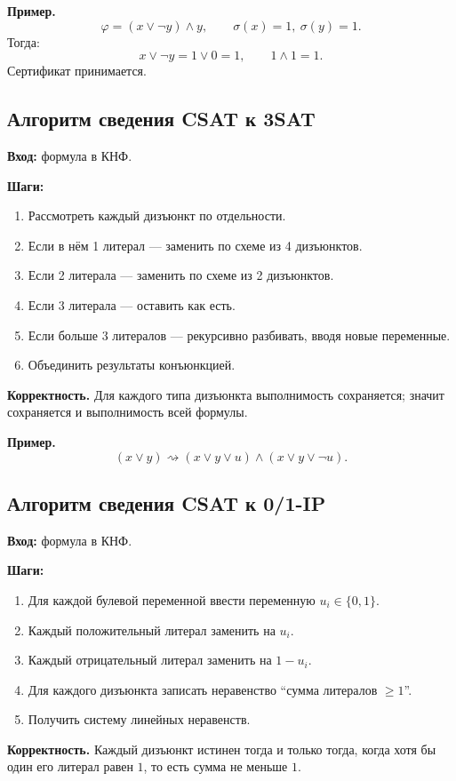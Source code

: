 \documentclass[12pt,a4paper]{article}
\theoremstyle{definition}
\theoremstyle{plain}
\begin{document}
\textbf{Пример.}
\[
\varphi=(x\vee \neg y)\wedge y,\qquad \sigma(x)=1,\ \sigma(y)=1.
\]
Тогда:
\[
x\vee\neg y=1\vee 0=1,\qquad 1\wedge 1=1.
\]
Сертификат принимается.

\subsection{Алгоритм сведения \textsc{CSAT} к \textsc{3SAT}}
\textbf{Вход:} формула в КНФ.

\textbf{Шаги:}
\begin{enumerate}
\item Рассмотреть каждый дизъюнкт по отдельности.
\item Если в нём 1 литерал --- заменить по схеме из 4 дизъюнктов.
\item Если 2 литерала --- заменить по схеме из 2 дизъюнктов.
\item Если 3 литерала --- оставить как есть.
\item Если больше 3 литералов --- рекурсивно разбивать, вводя новые переменные.
\item Объединить результаты конъюнкцией.
\end{enumerate}

\textbf{Корректность.}
Для каждого типа дизъюнкта выполнимость сохраняется; значит сохраняется и выполнимость всей формулы.

\textbf{Пример.}
\[
(x\vee y)\rightsquigarrow (x\vee y\vee u)\wedge(x\vee y\vee \neg u).
\]

\subsection{Алгоритм сведения \textsc{CSAT} к \textsc{0/1-IP}}
\textbf{Вход:} формула в КНФ.

\textbf{Шаги:}
\begin{enumerate}
\item Для каждой булевой переменной ввести переменную $u_i\in\{0,1\}$.
\item Каждый положительный литерал заменить на $u_i$.
\item Каждый отрицательный литерал заменить на $1-u_i$.
\item Для каждого дизъюнкта записать неравенство ``сумма литералов $\ge 1$''.
\item Получить систему линейных неравенств.
\end{enumerate}

\textbf{Корректность.}
Каждый дизъюнкт истинен тогда и только тогда, когда хотя бы один его литерал равен $1$, то есть сумма не меньше $1$.
\end{document}
